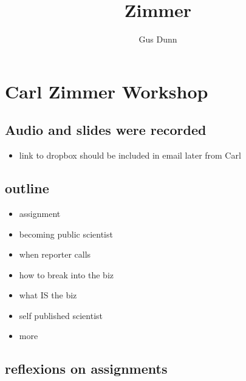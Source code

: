 \documentclass[letterpaper]{scrartcl}
\title{Zimmer}
\author{Gus Dunn}
\date{}
\begin{document}
\maketitle

{
\hypersetup{linkcolor=black}
\setcounter{tocdepth}{3}
\tableofcontents
}
\section{Carl Zimmer Workshop}\label{carl-zimmer-workshop}

\subsection{Audio and slides were
recorded}\label{audio-and-slides-were-recorded}

\begin{itemize}
\itemsep1pt\parskip0pt
\item
  link to dropbox should be included in email later from Carl
\end{itemize}

\subsection{outline}\label{outline}

\begin{itemize}
\itemsep1pt\parskip0pt
\item
  assignment
\item
  becoming public scientist
\item
  when reporter calls
\item
  how to break into the biz
\item
  what IS the biz
\item
  self published scientist
\item
  more
\end{itemize}

\subsection{reflexions on assignments}\label{reflexions-on-assignments}
\end{document}
